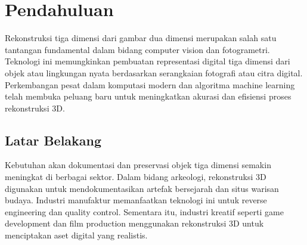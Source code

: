 \documentclass[12pt,a4paper]{article}
\begin{document}


\newpage
\tableofcontents
\newpage

\section{Pendahuluan}

Rekonstruksi tiga dimensi dari gambar dua dimensi merupakan salah satu tantangan fundamental dalam bidang computer vision dan fotogrametri. Teknologi ini memungkinkan pembuatan representasi digital tiga dimensi dari objek atau lingkungan nyata berdasarkan serangkaian fotografi atau citra digital. Perkembangan pesat dalam komputasi modern dan algoritma machine learning telah membuka peluang baru untuk meningkatkan akurasi dan efisiensi proses rekonstruksi 3D.

\subsection{Latar Belakang}

Kebutuhan akan dokumentasi dan preservasi objek tiga dimensi semakin meningkat di berbagai sektor. Dalam bidang arkeologi, rekonstruksi 3D digunakan untuk mendokumentasikan artefak bersejarah dan situs warisan budaya. Industri manufaktur memanfaatkan teknologi ini untuk reverse engineering dan quality control. Sementara itu, industri kreatif seperti game development dan film production menggunakan rekonstruksi 3D untuk menciptakan aset digital yang realistis.
\end{document}
